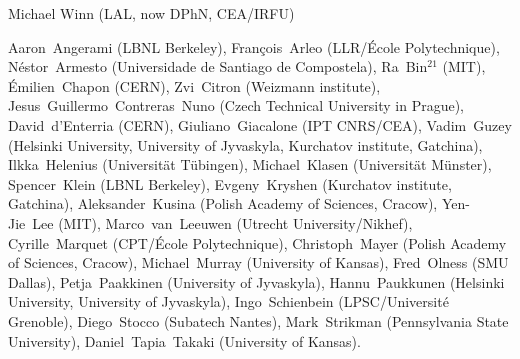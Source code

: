 { \small
{} Michael Winn (LAL, now DPhN, CEA/IRFU) %

 Aaron~Angerami (LBNL Berkeley), %
 Fran\c{c}ois~Arleo (LLR/{\'E}cole Polytechnique), %
 N{\'e}stor~Armesto (Universidade de Santiago de Compostela), %
 Ra~Bin$^{21}$ (MIT), %
 {\'E}milien~Chapon (CERN), %
 Zvi~Citron (Weizmann institute), %
 Jesus~Guillermo~Contreras~Nuno (Czech Technical University in Prague),  %
 David~d'Enterria (CERN), %
 Giuliano~Giacalone (IPT CNRS/CEA), %
 Vadim~Guzey (Helsinki University, University of Jyvaskyla, Kurchatov institute, Gatchina),  %
 Ilkka~Helenius (Universit\"{a}t T\"{u}bingen), %
 Michael~Klasen (Universit\"{a}t M\"{u}nster), %
 Spencer~Klein (LBNL Berkeley), %
 Evgeny~Kryshen (Kurchatov institute, Gatchina), %
 Aleksander~Kusina (Polish Academy of Sciences, Cracow), %
 Yen-Jie~Lee (MIT), %
 Marco~van~Leeuwen (Utrecht University/Nikhef), %
 Cyrille~Marquet (CPT/{\'E}cole Polytechnique), %
 Christoph~Mayer  (Polish Academy of Sciences, Cracow), %
 Michael~Murray (University of Kansas),%
 Fred~Olness (SMU Dallas), %
 Petja~Paakkinen (University of Jyvaskyla),%
 Hannu~Paukkunen (Helsinki University, University of Jyvaskyla), %
 Ingo~Schienbein (LPSC/Universit{\'e} Grenoble), %
 Diego~Stocco (Subatech Nantes), %
 Mark~Strikman (Pennsylvania State University), %
 Daniel~Tapia~Takaki (University of Kansas). %
}

